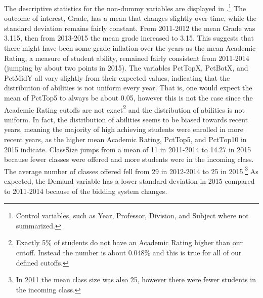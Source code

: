 The descriptive statistics for the non-dummy variables are displayed in .\footnote{Control variables, such as Year, Professor, Division, and Subject where not summarized.} 
The outcome of interest, Grade, has a mean that changes slightly over time, while the standard deviation remains fairly constant. 
From 2011-2012 the mean Grade was 3.115, then from 2013-2015 the mean grade increased to 3.15. 
This suggests that there might have been some grade inflation over the years as the mean Academic Rating, a measure of student ability, remained fairly consistent from 2011-2014 (jumping by about two points in 2015). 
The variables PctTopX, PctBotX, and PctMidY all vary slightly from their expected values, indicating that the distribution of abilities is not uniform every year. 
That is, one would expect the mean of PctTop5 to always be about 0.05, however this is not the case since the Academic Rating cutoffs are not exact\footnote{Exactly 5\% of students do not have an Academic Rating higher than our cutoff. Instead the number is about 0.048\% and this is true for all of our defined cutoffs.} and the distribution of abilities is not uniform. 
In fact, the distribution of abilities seems to be biased towards recent years, meaning the majority of high achieving students were enrolled in more recent years, as the higher mean Academic Rating, PctTop5, and PctTop10 in 2015 indicate. 
ClassSize jumps from a mean of 11 in 2011-2014 to 14.27 in 2015 because fewer classes were offered and more students were in the incoming class.
The average number of classes offered fell from 29 in 2012-2014 to 25 in 2015.\footnote{In 2011 the mean class size was also 25, however there were fewer students in the incoming class.}
As expected, the Demand variable has a lower standard deviation in 2015 compared to 2011-2014 because of the bidding system changes. 


\newpage{}

